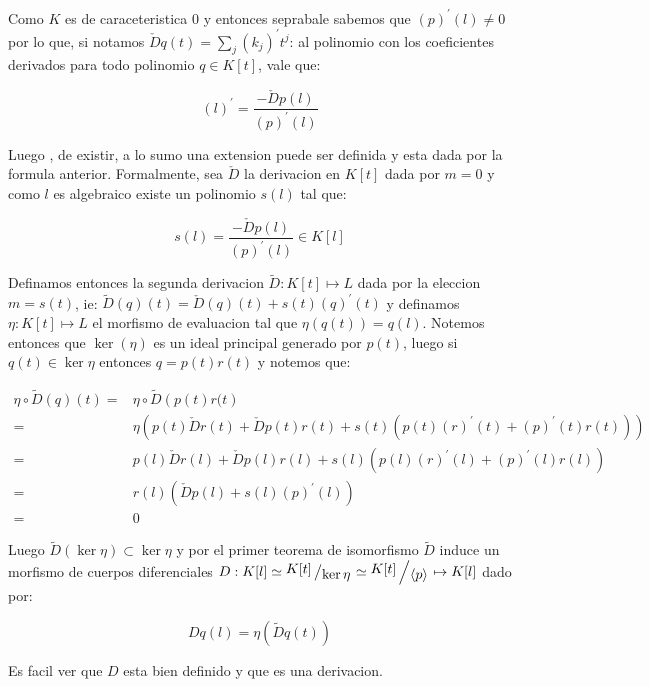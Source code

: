 \documentclass[11pt]{article}
\newcommand{\ip}[1]{\left\langle#1\right\rangle}
\newcommand{\quotient}[2]{{\raisebox{.2em}{$#1$}\left/\raisebox{-.2em}{$#2$}\right.}}
\newcommand{\derivation}[1]{\left(#1\right)^\prime}
\numberwithin{theorem}{subsection}
\newenvironment{proof}[1][Demostraci\'on]{\begin{trivlist}
		\item[\hskip \labelsep {\bfseries #1}]}{\end{trivlist}}
\newcommand{\qed}{\nobreak \ifvmode \relax \else
	\ifdim\lastskip<1.5em \hskip-\lastskip
	\hskip1.5em plus0em minus0.5em \fi \nobreak
	\vrule height0.75em width0.5em depth0.25em\fi}
\begin{document}
\begin{proof}
\begin{enumerate}
		Como $K$ es de caraceteristica $0$ y entonces seprabale sabemos que $\derivation{p}(l) \neq 0$ por lo que, si notamos $\check{D}q(t) = \sum\limits_j \derivation{k_j}t^j$: al polinomio con los coeficientes derivados para todo polinomio $q \in K[t]$, vale que:
		
		\begin{equation}
			\derivation{l} = \dfrac{- \check{D}p(l)}{\derivation{p}(l)}
		\end{equation}
		
		Luego , de existir, a lo sumo una extension puede ser definida y esta dada por la formula anterior. Formalmente, sea $\check{D}$ la derivacion en $K[t]$ dada por $m=0$ y como $l$ es algebraico existe un polinomio $s(l)$ tal que:
		
		\begin{equation}
		s(l) = \dfrac{-\check{D}p (l)}{\derivation{p}(l)} \in K[l]
		\end{equation}
		
		Definamos entonces la segunda derivacion $\widetilde{D} : K[t] \mapsto L$ dada por la eleccion $m = s(t)$, ie: $\widetilde{D}(q)(t) = \check{D}(q)(t) + s(t) \derivation{q}(t)$ y definamos $\eta: K[t] \mapsto L$ el morfismo de evaluacion tal que $\eta(q(t)) = q(l)$. Notemos entonces que $\ker(\eta)$ es un ideal principal generado por $p(t)$, luego si $q(t) \in \ker \eta$ entonces $q = p(t)r(t)$ y notemos que:
		
		\begin{equation}
		\begin{aligned}
			\eta \circ \widetilde{D} \left(q\right) (t) = & \eta \circ \widetilde{D} \left(p(t)r(t\right) \\
			= & \eta\left(p(t) \check{D}r(t) + \check{D}p(t)r(t) + s(t) \left(p(t) \derivation{r}(t) + \derivation{p}(t) r(t)\right) \right) \\
			= & p(l) \check{D}r(l) + \check{D}p(l)r(l) + s(l) \left(p(l) \derivation{r}(l) + \derivation{p}(l) r(l)\right) \\
			= & r(l) \left(\check{D}p (l) + s(l)\derivation{p}(l)\right) \\
			= & 0
		\end{aligned}
		\end{equation}
		
	Luego $\widetilde{D}\left(\ker \eta\right) \subset \ker \eta$ y por el primer teorema de isomorfismo $\widetilde{D}$ induce un morfismo de cuerpos diferenciales $D : K[l] \simeq \quotient{K[t]}{\ker \eta} \simeq  \quotient{K[t]}{\ip{p}} \mapsto K[l]$ dado por:
	
	\begin{equation}
		Dq(l) = \eta \left(\widetilde{D}q (t)\right)
	\end{equation}		
		
		Es facil ver que $D$ esta bien definido y que es una derivacion. \qed
		
	\end{enumerate}
	
\end{proof}
\end{document}
